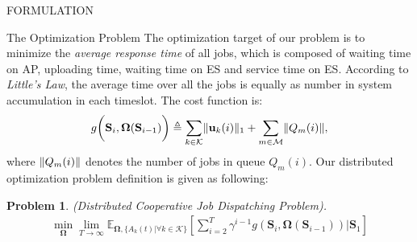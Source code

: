 \documentclass[10pt, conference, letterpaper]{IEEEtran}
\newtheorem{problem}{Problem}
\newcommand{\define}{\triangleq}
\renewcommand{\vec}{\mathbf}
\DeclarePairedDelimiter{\norm}{\|}{\|}
\DeclarePairedDelimiter{\Inorm}{\|}{\|_1}
\newcommand{\apSet}{\mathcal{K}}
\newcommand{\esSet}{\mathcal{M}}
\newcommand{\Stat}{\mathbf{S}}
\newcommand{\Policy}{\mathbf{\Omega}}
\begin{document}
\begin{section}{FORMULATION}
        \begin{subsection}{The Optimization Problem}
            The optimization target of our problem is to minimize the \emph{average response time} of all jobs, which is composed of waiting time on AP, uploading time, waiting time on ES and service time on ES. According to \emph{Little's Law}, the average time over all the jobs is equally as number in system accumulation in each timeslot. The cost function is:
            \begin{align}
                g \bigg( \Stat_{i}, \Policy(\Stat_{i-1}) \bigg) \define \sum_{k\in\apSet} \Inorm{\vec{u}_{k}(i)} + \sum_{m\in\esSet} \norm{Q_m(i)},
            \end{align}
            where $\norm{Q_m(i)}$ denotes the number of jobs in queue $Q_m(i)$.
            Our distributed optimization problem definition is given as following:
            \begin{problem}
                (Distributed Cooperative Job Dispatching Problem).
                \begin{gather}
                    \min_{\Policy} \lim_{T \to \infty}
                        \mathbb{E}_{\Policy, \{A_k(t)|\forall k\in\apSet\}}
                            [\sum_{i=2}^{T} \gamma^{i-1} g(\Stat_{i}, \Policy(\Stat_{i-1}))|\Stat_1]
                \end{gather}
            \end{problem}


\end{subsection}
\end{section}
\end{document}
